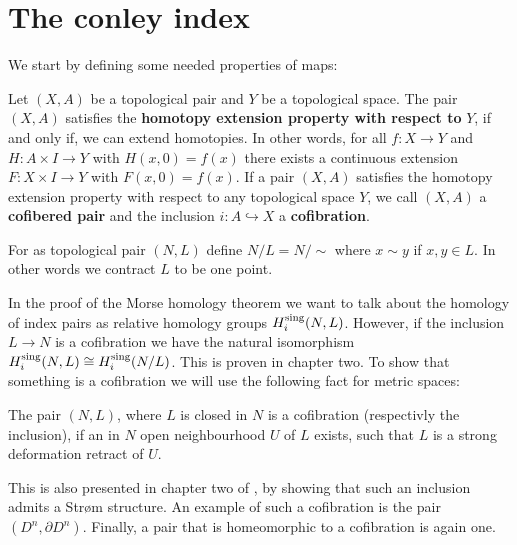 \section{The conley index}
We start by defining some needed properties of maps:
\begin{definition}[Cofibration]
    Let $(X,A)$ be a topological pair and $Y$ be a topological space. The pair $(X,A)$ satisfies the \textbf{homotopy extension property with respect to } $Y$, if and only if, we can extend homotopies. In other words, for all $f:X\to Y$ and $H:A\times I\to Y$ with $H(x,0)=f(x)$ there exists a continuous extension $F:X\times I\to Y$ with $F(x,0)=f(x)$. 
    If a pair $(X,A)$ satisfies the homotopy extension property with respect to any topological space $Y$, we call $(X,A)$ a \textbf{cofibered pair} and the inclusion $i:A\hookrightarrow X$ a \textbf{cofibration}.
\end{definition}

\begin{definition} For as topological pair $(N,L)$ define $N/L=N/ \sim$ where $x \sim y $ if $x,y\in L$. In other words we contract $L$ to be one point.
\end{definition}

\begin{remark}
In the proof of the Morse homology theorem we want to talk about the homology of index pairs as relative homology groups $H^{\mathrm{sing}}_i(N,L)$. However, if the inclusion $L\to N$ is a cofibration we have the natural isomorphism $H^{\mathrm{sing}}_i(N,L) \cong H^{\mathrm{sing}}_i(N/L)$. This is proven in \cite{LecturesonMorseHomology} chapter two. To show that something is a cofibration we will use the following fact for metric spaces: 

The pair $(N,L)$, where $L$ is closed in $N$ is a cofibration (respectivly the inclusion), if an in $N$ open neighbourhood $U$ of $L$ exists, such that $L$ is a strong deformation retract of $U$. 

 This is also presented in chapter two of \cite{LecturesonMorseHomology}, by showing that such an inclusion admits a Str\o{}m structure. An example of such a cofibration is the pair $(D^n,\partial D^n)$. Finally, a pair that is homeomorphic to a cofibration is again one.
\end{remark}

